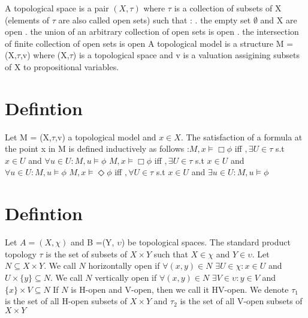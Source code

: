 \documentclass[12pt, a4paper]{scrreprt}
\begin{document}
A topological space is a pair $(X, \tau)$ where $\tau$ is a collection of subsets of X (elements of $\tau$ are also called open sets) such that : 
\newline
{}. the empty set $\emptyset $ and X are open
. the union of an arbitrary collection of open sets is open
. the intersection of finite collection of open sets is open
\newline
\newline
A topological model is a structure M = (X,$\tau$,v) where (X,$\tau$) is a topological space
and v is a valuation assigining subsets of X to propositional variables.

\section{Defintion}
Let M = (X,$\tau$,v) a topological model and $x \in X$. The satisfaction of a formula
at the point x in M is defined inductively as follows :$M,x \models \Box \phi$ iff $,\exists U \in \tau$ s.t $x \in U$ and $\forall u \in U : M,u \models \phi$
\newline
$M,x \models \Box \phi$ iff $,\exists U \in \tau$ s.t $x \in U$ and $\forall u \in U : M,u \models \phi$
\newline
$M,x \models \Diamond \phi$ iff $,\forall U \in \tau$ s.t $x \in U$ and $\exists u \in U : M,u \models \phi$

\section{Defintion}
Let $A = (X, \chi)$ and B =(Y, $\upsilon$) be topological spaces. The standard product topology $\tau$ is the set of subsets of 
$X \times Y$ such that $X \in \chi$ and $Y \in \upsilon$. \newline
Let $N \subseteq X \times Y $. We call $N$ horizontally open if $\forall (x,y) \in N $ $\exists U \in \chi : x \in U $ and $ U \times \{ y \} \subseteq N$. \newline We call $N$ 
vertically open if $\forall (x,y) \in N$ $\exists V \in \upsilon : y \in V$ and  $ \{ x \} \times V \subseteq N$ \newline
If $N$ is H-open and V-open, then we call it HV-open. \newline
We denote $\tau_1$ is the set of all H-open subsets of $X \times Y$ and $\tau_2$ is the set of all V-open subsets of $X\times Y$
\end{document}
